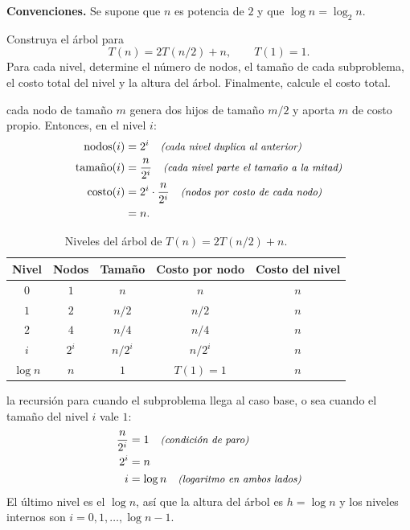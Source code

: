 \documentclass[11pt,letterpaper]{article}
\begin{document}

\noindent\textbf{Convenciones.}
Se supone que $n$ es potencia de $2$ y que
$\log n = \log_2 n$.

\noindent Construya el árbol para
\[
  T(n) = 2T(n/2) + n, \qquad T(1) = 1.
\]
Para cada nivel, determine el número de nodos, el tamaño de cada
subproblema, el costo total del nivel y la altura del árbol.
Finalmente, calcule el costo total.

 cada nodo de tamaño $m$ genera
dos hijos de tamaño $m/2$ y aporta $m$ de costo propio. Entonces, en
el nivel $i$:
\begin{align*}
  \text{nodos}(i) &= 2^{i} \quad\text{\small\itshape (cada nivel duplica al anterior)} \\
  \text{tamaño}(i) &= \frac{n}{2^{i}}
      \quad\text{\small\itshape (cada nivel parte el tamaño a la mitad)} \\
  \text{costo}(i) &= 2^{i} \cdot \frac{n}{2^{i}}
      \quad\text{\small\itshape (nodos por costo de cada nodo)} \\
                  &= n.
\end{align*}

\begin{table}[H]
  \centering
  \begin{tabular}{ccccc}
    \toprule
    \textbf{Nivel} & \textbf{Nodos} & \textbf{Tamaño}
      & \textbf{Costo por nodo} & \textbf{Costo del nivel} \\
    \midrule
    $0$ & $1$ & $n$ & $n$ & $n$ \\
    $1$ & $2$ & $n/2$ & $n/2$ & $n$ \\
    $2$ & $4$ & $n/4$ & $n/4$ & $n$ \\
    $i$ & $2^{i}$ & $n/2^{i}$ & $n/2^{i}$ & $n$ \\
    $\log n$ & $n$ & $1$ & $T(1) = 1$ & $n$ \\
    \bottomrule
  \end{tabular}
  \caption{Niveles del árbol de $T(n) = 2T(n/2) + n$.}
  \label{ej11:ej11-tab-niveles}
\end{table}

 la recursión para cuando el subproblema llega al caso
base, o sea cuando el tamaño del nivel $i$ vale $1$:
\begin{align*}
  \frac{n}{2^{i}} &= 1 \quad\text{\small\itshape (condición de paro)} \\
  2^{i} &= n \\
  i &= \log n \quad\text{\small\itshape (logaritmo en ambos lados)}
\end{align*}
El último nivel es el $\log n$, así que la altura del árbol es
$h = \log n$ y los niveles internos son $i = 0, 1, \dots, \log n - 1$.
\end{document}

